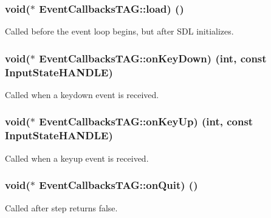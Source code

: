 \subsubsection[{load}]{\setlength{\rightskip}{0pt plus 5cm}void($\ast$ Event\+Callbacks\+T\+A\+G\+::load) ()}\label{struct_event_callbacks_t_a_g_aafaa4679ab0034c9b118b4e21c2488aa}
Called before the event loop begins, but after S\+D\+L initializes. \hypertarget{struct_event_callbacks_t_a_g_ae74b31565dbcbc53896a67d7c678bd04}{}
\subsubsection[{on\+Key\+Down}]{\setlength{\rightskip}{0pt plus 5cm}void($\ast$ Event\+Callbacks\+T\+A\+G\+::on\+Key\+Down) (int, const {\bf Input\+State\+H\+A\+N\+D\+L\+E})}\label{struct_event_callbacks_t_a_g_ae74b31565dbcbc53896a67d7c678bd04}
Called when a keydown event is received. \hypertarget{struct_event_callbacks_t_a_g_aa456999060f08075195ba73dc8e6a23e}{}
\subsubsection[{on\+Key\+Up}]{\setlength{\rightskip}{0pt plus 5cm}void($\ast$ Event\+Callbacks\+T\+A\+G\+::on\+Key\+Up) (int, const {\bf Input\+State\+H\+A\+N\+D\+L\+E})}\label{struct_event_callbacks_t_a_g_aa456999060f08075195ba73dc8e6a23e}
Called when a keyup event is received. \hypertarget{struct_event_callbacks_t_a_g_a7caef22112076592e6192f59df21963e}{}
\subsubsection[{on\+Quit}]{\setlength{\rightskip}{0pt plus 5cm}void($\ast$ Event\+Callbacks\+T\+A\+G\+::on\+Quit) ()}\label{struct_event_callbacks_t_a_g_a7caef22112076592e6192f59df21963e}
Called after step returns false. \hypertarget{struct_event_callbacks_t_a_g_a0e1bb533268f270bb6c1b67898666f25}{}
